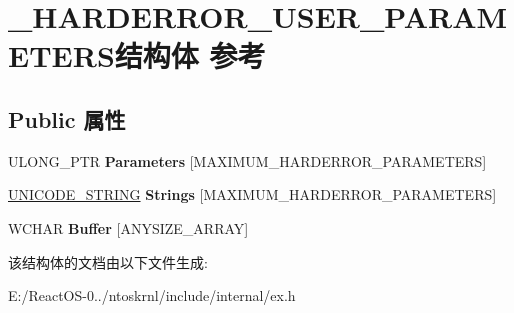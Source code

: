 \hypertarget{struct___h_a_r_d_e_r_r_o_r___u_s_e_r___p_a_r_a_m_e_t_e_r_s}{}\section{\+\_\+\+H\+A\+R\+D\+E\+R\+R\+O\+R\+\_\+\+U\+S\+E\+R\+\_\+\+P\+A\+R\+A\+M\+E\+T\+E\+R\+S结构体 参考}
\label{struct___h_a_r_d_e_r_r_o_r___u_s_e_r___p_a_r_a_m_e_t_e_r_s}
\subsection*{Public 属性}
\begin{DoxyCompactItemize}
\item 
\mbox{\label{struct___h_a_r_d_e_r_r_o_r___u_s_e_r___p_a_r_a_m_e_t_e_r_s_a3264406a2400c3b2e4222b8f20d95572}} 
U\+L\+O\+N\+G\+\_\+\+P\+TR {\bfseries Parameters} \mbox{[}M\+A\+X\+I\+M\+U\+M\+\_\+\+H\+A\+R\+D\+E\+R\+R\+O\+R\+\_\+\+P\+A\+R\+A\+M\+E\+T\+E\+RS\mbox{]}
\item 
\mbox{\label{struct___h_a_r_d_e_r_r_o_r___u_s_e_r___p_a_r_a_m_e_t_e_r_s_a1db7333c3a54ffff6a175fb3ccce520e}} 
\hyperlink{struct___u_n_i_c_o_d_e___s_t_r_i_n_g}{U\+N\+I\+C\+O\+D\+E\+\_\+\+S\+T\+R\+I\+NG} {\bfseries Strings} \mbox{[}M\+A\+X\+I\+M\+U\+M\+\_\+\+H\+A\+R\+D\+E\+R\+R\+O\+R\+\_\+\+P\+A\+R\+A\+M\+E\+T\+E\+RS\mbox{]}
\item 
\mbox{\label{struct___h_a_r_d_e_r_r_o_r___u_s_e_r___p_a_r_a_m_e_t_e_r_s_a3dcfc241ab8cf6fa270e7a1b1681eda5}} 
W\+C\+H\+AR {\bfseries Buffer} \mbox{[}A\+N\+Y\+S\+I\+Z\+E\+\_\+\+A\+R\+R\+AY\mbox{]}
\end{DoxyCompactItemize}


该结构体的文档由以下文件生成\+:\begin{DoxyCompactItemize}
\item 
E\+:/\+React\+O\+S-\/0../ntoskrnl/include/internal/ex.\+h\end{DoxyCompactItemize}
